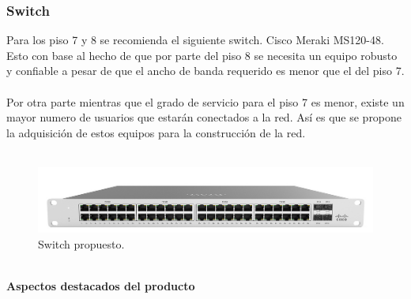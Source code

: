 \documentclass[12pt,letterpaper]{article}
\begin{document}
\subsubsection{Switch}
Para los piso 7 y 8 se recomienda el siguiente switch. Cisco Meraki MS120-48. 
Esto con base al hecho de que por parte del piso 8 se necesita un equipo robusto y confiable 
a pesar de que el ancho de banda requerido es menor que el del piso 7.
\\ \\
Por otra parte mientras que el grado de servicio para el piso 7 es menor, existe un mayor 
numero de usuarios que estarán conectados a la red. Así es que se propone la adquisición de estos 
equipos para la construcción de la red. \cite{swicthes}
\\ \\
\begin{figure}[ht]
    \centering
    \includegraphics[scale=.6]{imagenes/sw1.PNG}
    \caption{Switch propuesto.}
\end{figure}
\\ 
\textbf{Aspectos destacados del producto}
\end{document}

